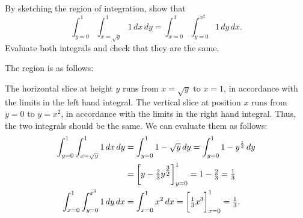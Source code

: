 \documentclass[a4paper]{amsart}
\renewenvironment{solution}{\SolutionInline}{\endSolutionInline}
\begin{document}
\begin{exercise}
 By sketching the region of integration, show that 
 \[ \int_{y=0}^1\int_{x=\sqrt{y}}^1 1\,dx\,dy = 
     \int_{x=0}^1\int_{y=0}^{x^2}1\,dy\,dx.
 \]
 Evaluate both integrals and check that they are the same.
\end{exercise}
\begin{solution}
 The region is as follows:
 \begin{center}
 \end{center}
 The horizontal slice at height $y$ runs from $x=\sqrt{y}$ to $x=1$,
 in accordance with the limits in the left hand integral.  The
 vertical slice at position $x$ runs from $y=0$ to $y=x^2$, in
 accordance with the limits in the right hand integral.  Thus, the two
 integrals should be the same.  We can evaluate them as follows:
 \begin{align*}
  \int_{y=0}^1\int_{x=\sqrt{y}}^1 1\,dx\,dy
   &= \int_{y=0}^1 1-\sqrt{y} \,dy = \int_{y=0}^1 1-y^{\frac{1}{2}} \,dy\\ 
   &= \CH{y-\tfrac{2}{3}y^{\tfrac{3}{2}}}_{y=0}^1 = 1-\tfrac{2}{3}
    = \tfrac{1}{3} \\
  \int_{x=0}^1\int_{y=0}^{x^2}1\,dy\,dx 
   &= \int_{x=0}^1 x^2\, dx = \CH{\tfrac{1}{3}x^3}_{x=0}^1 = \tfrac{1}{3}.
 \end{align*}
\end{solution}
\end{document}
